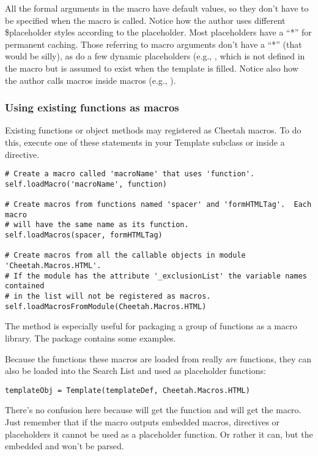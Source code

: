 All the formal arguments in the  macro have default values, so
they don't have to be specified when the macro is called.  Notice how the author
uses different \$placeholder styles according to the placeholder.  Most
placeholders have a ``*'' for permanent caching.  Those referring to macro
arguments don't have a ``*'' (that would be silly), as do a few dynamic
placeholders (e.g., , which is not defined in
the macro but is assumed to exist when the template is filled.  Notice also how
the author calls macros inside macros (e.g., ).

\subsubsection{Using existing functions as macros}
\label{directives.macros.existingFunctions}
Existing functions or object methods may registered as Cheetah macros.  To do
this, execute one of these statements in your Template subclass or inside a
 directive.  

\begin{verbatim}
# Create a macro called 'macroName' that uses 'function'.
self.loadMacro('macroName', function)

# Create macros from functions named 'spacer' and 'formHTMLTag'.  Each macro
# will have the same name as its function.
self.loadMacros(spacer, formHTMLTag)

# Create macros from all the callable objects in module 'Cheetah.Macros.HTML'.
# If the module has the attribute '_exclusionList' the variable names contained
# in the list will not be registered as macros.
self.loadMacrosFromModule(Cheetah.Macros.HTML)
\end{verbatim}

The  method is especially useful for
packaging a group of functions as a macro library.  The 
package contains some examples.

Because the functions these macros are loaded from really {\em are} functions,
they can also be loaded into the Search List and used as placeholder functions:

\begin{verbatim}
templateObj = Template(templateDef, Cheetah.Macros.HTML)
\end{verbatim}

There's no confusion here because  will get the function and
 will get the macro.  Just remember that if the macro outputs
embedded macros, directives or placeholders it cannot be used as a placeholder
function.  Or rather it can, but the embedded  and
 won't be parsed.

